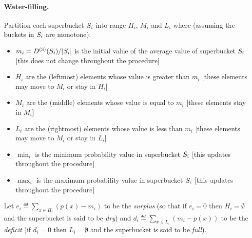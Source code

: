 \paragraph{Water-filling.}
Partition each superbucket $S_i$ into range $H_i$, $M_i$ and $L_i$ where (assuming the buckets in  $S_i$ are monotone):
\begin{itemize}[-]
  \item $m_i={D^{(3)}(S_i)}/{\left\lvert S_i \right\rvert}$ is the initial value of the average value of superbucket $S_i$ [this does not change throughout the procedure]
  \item $H_i$ are the (leftmost) elements whose value is greater than $m_i$ \hfill [these elements may move to $M_i$ or stay in $H_i$]
  \item $M_i$ are the (middle) elements whose value is equal to $m_i$    \hfill[these elements stay in $M_i$]
  \item $L_i$ are the (rightmost) elements whose value is less than $m_i$  \hfill[these elements may move to $M_i$ or stay in $L_i$]
  \item $\min_i$ is the minimum probability value in superbucket $S_i$   \hfill[this updates throughout the procedure]
  \item $\max_i$ is the maximum probability value in superbucket $S_i$   \hfill[this updates throughout the procedure]
\end{itemize}
Let $e_i \eqdef \sum_{x \in H_i} (p(x) - m_i)$ to be the \emph{surplus}  (so that if $e_i=0$ then $H_i=\emptyset$ and the superbucket is said to be \emph{dry}) and $d_i \eqdef \sum_{x \in L_i} (m_i- p(x))$ to be the \emph{deficit} (if $d_i = 0$ then $L_i=\emptyset$ and the superbucket is said to be \emph{full}).

